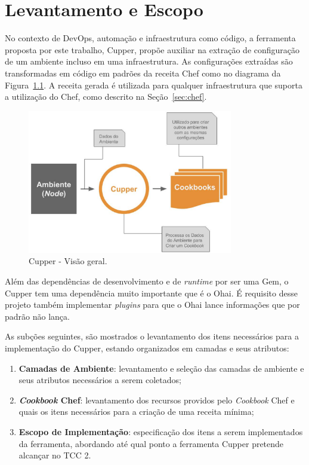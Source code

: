 \newpage\null\thispagestyle{empty}\newpage
\chapter{Levantamento e Escopo}
\label{chap:lev_es}

No contexto de DevOps, automação e infraestrutura como código, a ferramenta
proposta por este trabalho, Cupper, propõe auxiliar na extração de configuração
de um ambiente incluso em uma infraestrutura. As configurações extraídas são
transformadas em código em padrões da receita Chef como 
no diagrama da Figura~\ref{fig:cupper_geral}. A
receita gerada é utilizada para qualquer infraestrutura que suporta a
utilização do Chef, como descrito na Seção~\ref{sec:chef}.

\begin{figure}[H]
  \centering
  \label{fig:cupper_geral}
  \includegraphics[width=0.8\textwidth]{figuras/cupper_geral.eps}
  \caption{Cupper - Visão geral.}
\end{figure}

Além das dependências de desenvolvimento e de \textit{runtime} por ser uma Gem,
o Cupper tem uma dependência muito
importante que é o Ohai. É requisito desse projeto também implementar
\textit{plugins} para que o Ohai lance informações que por padrão 
não lança.

As subções seguintes, são mostrados o levantamento dos itens necessários para
a implementação do Cupper, estando organizados em camadas e seus atributos:

\begin{enumerate}
  \item \textbf{Camadas de Ambiente}: levantamento e seleção das camadas de ambiente
    e seus atributos necessários a serem coletados;
  \item \textbf{\textit{Cookbook} Chef}: levantamento dos recursos providos pelo \textit{Cookbook} Chef e quais os
    itens necessários para a criação de uma receita mínima;
  \item \textbf{Escopo de Implementação}: especificação dos itens a serem implementados
    da ferramenta, abordando até qual ponto a ferramenta Cupper pretende alcançar
    no TCC 2.
\end{enumerate}





